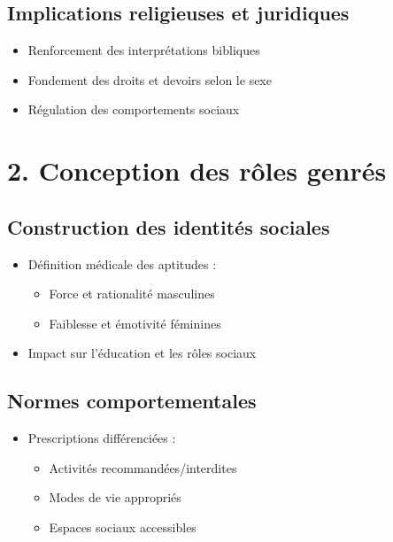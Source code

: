 \documentclass[
  letterpaper,
  DIV=11,
  numbers=noendperiod]{scrreprt}
\providecommand{\tightlist}{%
  \setlength{\itemsep}{0pt}\setlength{\parskip}{0pt}}\usepackage{longtable,booktabs,array}
\begin{document}
\subsection{Implications religieuses et
juridiques}\label{implications-religieuses-et-juridiques}

\begin{itemize}
\tightlist
\item
  Renforcement des interprétations bibliques
\item
  Fondement des droits et devoirs selon le sexe
\item
  Régulation des comportements sociaux
\end{itemize}

\section{2. Conception des rôles
genrés}\label{conception-des-ruxf4les-genruxe9s}

\subsection{Construction des identités
sociales}\label{construction-des-identituxe9s-sociales}

\begin{itemize}
\tightlist
\item
  Définition médicale des aptitudes :

  \begin{itemize}
  \tightlist
  \item
    Force et rationalité masculines
  \item
    Faiblesse et émotivité féminines
  \end{itemize}
\item
  Impact sur l'éducation et les rôles sociaux
\end{itemize}

\subsection{Normes comportementales}\label{normes-comportementales}

\begin{itemize}
\tightlist
\item
  Prescriptions différenciées :

  \begin{itemize}
  \tightlist
  \item
    Activités recommandées/interdites
  \item
    Modes de vie appropriés
  \item
    Espaces sociaux accessibles
  \end{itemize}
\end{itemize}
\end{document}
